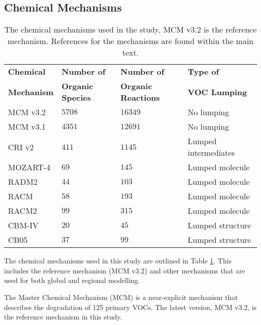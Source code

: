 
\subsection{Chemical Mechanisms} \label{ss:mechanisms}

{
    \renewcommand{\arraystretch}{1.3}
    \begin{table}
        \centering
        \begin{tabular}{llll}
            \hline \hline
            \textbf{Chemical} & \textbf{Number of} & \textbf{Number of} & \textbf{Type of} \\ 
            \textbf{Mechanism} & \textbf{Organic Species} & \textbf{Organic Reactions} & \textbf{VOC Lumping} \\ \hline
            MCM v3.2 & $5708$ & $16349$ & No lumping \\ \hline
            MCM v3.1 & $4351$ & $12691$ & No lumping \\ \hline
            CRI v2 & $411$ & $1145$ & Lumped intermediates \\ \hline
            MOZART-4 & $69$ & $145$ & Lumped molecule \\ \hline
            RADM2 & $44$ & $103$ & Lumped molecule \\ \hline
            RACM & $58$ & $193$ & Lumped molecule \\ \hline
            RACM2 & $99$ & $315$ & Lumped molecule \\ \hline
            CBM-IV & $20$ & $45$ & Lumped structure \\ \hline
            CB05 & $37$ & $99$ & Lumped structure \\ 
            \hline \hline
        \end{tabular}
        \vspace{0mm}
        \caption{The chemical mechanisms used in the study, MCM v3.2 is the reference mechanism. References for the mechanisms are found within the main text.}
        \vspace{-4mm}
        \label{t:mechanisms}
    \end{table}
}

The chemical mechanisms used in this study are outlined in Table \ref{t:mechanisms}. 
This includes the reference mechanism (MCM v3.2) and other mechanisms that are used for both global and regional modelling. 

The Master Chemical Mechanism (MCM) \citep{Jenkin:1997, Jenkin:2003, Saunders:2003, Bloss:2005, MCM_Site} is a near-explicit mechanism that describes the degradation of 125 primary VOCs. 
The latest version, MCM v3.2, is the reference mechanism in this study.

